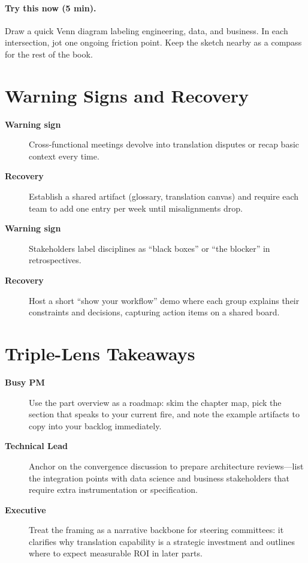 \paragraph{Try this now (5 min).} Draw a quick Venn diagram labeling engineering, data, and business. In each intersection, jot one ongoing friction point. Keep the sketch nearby as a compass for the rest of the book.

\section{Warning Signs and Recovery}
\label{sec:intro-warning}
\begin{description}
    \item[\textbf{Warning sign}] Cross-functional meetings devolve into translation disputes or recap basic context every time.
    \item[\textbf{Recovery}] Establish a shared artifact (glossary, translation canvas) and require each team to add one entry per week until misalignments drop.
    \item[\textbf{Warning sign}] Stakeholders label disciplines as ``black boxes'' or ``the blocker'' in retrospectives.
    \item[\textbf{Recovery}] Host a short ``show your workflow'' demo where each group explains their constraints and decisions, capturing action items on a shared board.
\end{description}

\section{Triple-Lens Takeaways}
\label{sec:intro-triple}

\begin{description}
    \item[\textbf{Busy PM}] Use the part overview as a roadmap: skim the chapter map, pick the section that speaks to your current fire, and note the example artifacts to copy into your backlog immediately.
    \item[\textbf{Technical Lead}] Anchor on the convergence discussion to prepare architecture reviews—list the integration points with data science and business stakeholders that require extra instrumentation or specification.
    \item[\textbf{Executive}] Treat the framing as a narrative backbone for steering committees: it clarifies why translation capability is a strategic investment and outlines where to expect measurable ROI in later parts.
\end{description}

